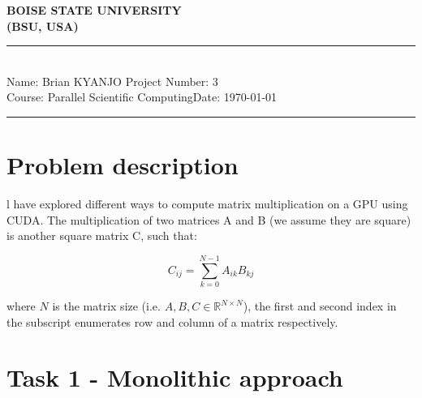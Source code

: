 \documentclass[12pt,a4paper]{article}
\newcommand{\student}{Brian KYANJO }
\newcommand{\course}{Parallel Scientific Computing}
\newcommand{\assignment}{3}
\newcommand{\R}{\mathbb{R}}
\begin{document}
	
	\thispagestyle{empty}
	\begin{center}
		\textbf{BOISE STATE UNIVERSITY \\[0.5cm]
			(BSU, USA)}
		\vspace{.2cm}
	\end{center}
	
	\noindent
	\rule{17cm}{0.2cm}\\[0.3cm]
	Name: \student \hfill Project Number: \assignment\\[0.1cm]
	Course: \course \hfill Date: \today\\
	\rule{17cm}{0.05cm}
	\vspace{.2cm}

\section*{Problem description}
l have explored different ways to compute matrix multiplication on a GPU using CUDA. The multiplication of two matrices A and B (we assume they are square) is another square matrix C, such that:

\begin{equation}
C_{ij} = \sum_{k=0}^{N-1} A_{ik} B_{kj}
\end{equation}

\noindent where $N$ is the matrix size (i.e. $A, B, C \in \R^{N\times N}$),  the first and second index in the subscript enumerates row and column of a matrix respectively. 

\section*{Task 1 - Monolithic approach}
\end{document}

